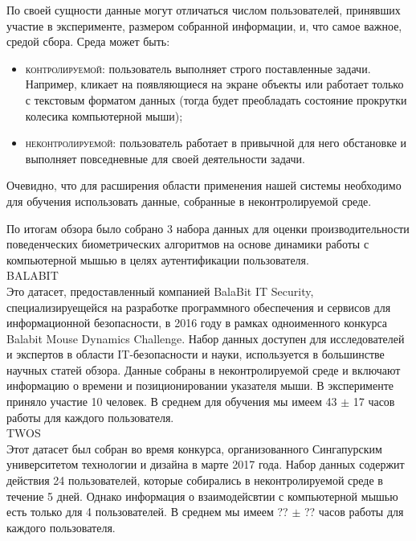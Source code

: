 \documentclass[12pt]{article}
\begin{document}
    \par По своей сущности данные могут отличаться числом пользователей, принявших участие в эксперименте, размером собранной информации, и, что самое важное, средой сбора. Среда может быть:
    \begin{itemize}
        \item \textsc{контролируемой}: пользователь выполняет строго поставленные задачи. Например, кликает на появляющиеся на экране объекты или работает только с текстовым форматом данных (тогда будет преобладать состояние прокрутки колесика компьютерной мыши);
        \item \textsc{неконтролируемой}: пользователь работает в привычной для него обстановке и выполняет повседневные для своей деятельности задачи.
    \end{itemize}
    \par Очевидно, что для расширения области применения нашей системы необходимо для обучения использовать данные, собранные в неконтролируемой среде. \\
    \par По итогам обзора было собрано 3 набора данных для оценки производительности поведенческих биометрических алгоритмов на основе динамики работы с компьютерной мышью в целях аутентификации пользователя. \\
    
    \noindent\textsc{BALABIT} \cite{BALABIT} \\
    \noident Это датасет, предоставленный компанией BalaBit IT Security, специализируещейся на разработке программного обеспечения и сервисов для информационной безопасности, в 2016 году в рамках одноименного конкурса Balabit Mouse Dynamics Challenge. Набор данных доступен для исследователей и экспертов в области IT-безопасности и науки, используется в большинстве научных статей обзора. Данные собраны в неконтролируемой среде и включают информацию о времени и позиционировании указателя мыши. В эксперименте приняло участие 10 человек. В среднем для обучения мы имеем 43 $\pm$ 17 часов работы для каждого пользователя. \\
    
    \noindent\textsc{TWOS} \cite{TWOS} \\
    \noident Этот датасет был собран во время конкурса, организованного Сингапурским университетом технологии и дизайна в марте 2017 года. Набор данных содержит действия 24 пользователей, которые собирались в неконтролируемой среде в течение 5 дней. Однако информация о взаимодейсвтии с компьютерной мышью есть только для 4 пользователей. В среднем мы имеем ?? $\pm$ ?? часов работы для каждого пользователя. \\
    
\end{document}
